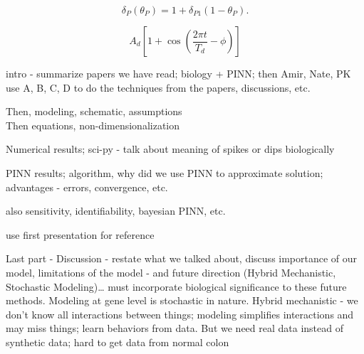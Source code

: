 \documentclass[11pt]{article}
\begin{document}
\[
\delta_P(\theta_P)=1+\delta_{P1}(1-\theta_P).
\]

\[
A_d \left[ 1 + \cos\left( \frac{2\pi t}{T_d} - \phi \right) \right]
\]


\newpage
\begin{abstract}
Reduced form\dots{} (250 words max)
\end{abstract}

intro - summarize papers we have read; biology + PINN; then Amir, Nate, PK use A, B, C, D to do the techniques from the papers, discussions, etc.

Then, modeling, schematic, assumptions \\
Then equations, non-dimensionalization

Numerical results; sci-py - talk about meaning of spikes or dips biologically

PINN results; algorithm, why did we use PINN to approximate solution; advantages
- errors, convergence, etc.

also sensitivity, identifiability, bayesian PINN, etc.

use first presentation for reference

Last part - Discussion - restate what we talked about, discuss importance of our model, limitations of the model - and future direction (Hybrid Mechanistic, Stochastic Modeling)\dots{} must incorporate biological significance to these future methods.
Modeling at gene level is stochastic in nature.
Hybrid mechanistic - we don't know all interactions between things; modeling simplifies interactions and may miss things; learn behaviors from data. But we need real data instead of synthetic data; hard to get data from normal colon~\cite{liu2022hybrid,yazdani2020systems}




\end{document}
